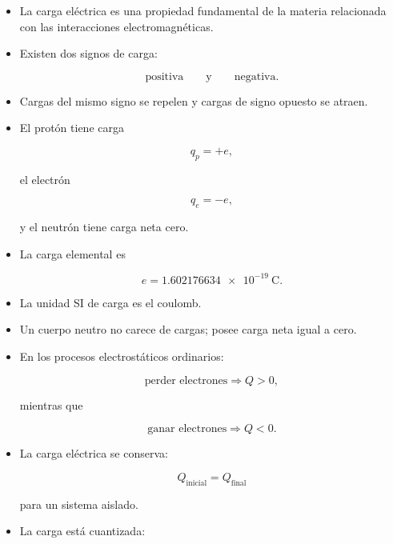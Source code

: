 
\begin{resumen}

\begin{itemize}

    \item La carga eléctrica es una propiedad fundamental de la materia
    relacionada con las interacciones electromagnéticas.

    \item Existen dos signos de carga:

    \[
    \text{positiva}
    \qquad\text{y}\qquad
    \text{negativa}.
    \]

    \item Cargas del mismo signo se repelen y cargas de signo opuesto se
    atraen.

    \item El protón tiene carga

    \[
    q_p=+e,
    \]

    el electrón

    \[
    q_e=-e,
    \]

    y el neutrón tiene carga neta cero.

    \item La carga elemental es

    \[
    e=
    \SI{1.602176634e-19}{\coulomb}.
    \]

    \item La unidad SI de carga es el coulomb.

    \item Un cuerpo neutro no carece de cargas; posee carga neta igual a
    cero.

    \item En los procesos electrostáticos ordinarios:

    \[
    \text{perder electrones}
    \Longrightarrow
    Q>0,
    \]

    mientras que

    \[
    \text{ganar electrones}
    \Longrightarrow
    Q<0.
    \]

    \item La carga eléctrica se conserva:

    \[
    Q_{\text{inicial}}
    =
    Q_{\text{final}}
    \]

    para un sistema aislado.

    \item La carga está cuantizada:


\end{itemize}
\end{resumen}
